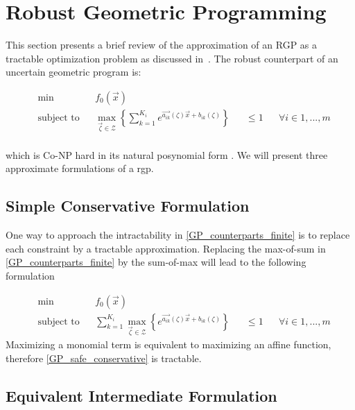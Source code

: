 \section{Robust Geometric Programming} \label{RGP}

This section presents a brief review of the approximation of an RGP as a
tractable optimization problem as discussed in~\cite{Saab2018}.
The robust counterpart of an uncertain geometric program is:

\begin{equation}
\begin{aligned}
& \min &&f_0\left(\vec{x}\right)\\
& \text{subject to} &&\max_{\vec{\zeta} \in \mathcal{Z}} \left\{\textstyle{\sum}_{k=1}^{K_i}e^{\vec{a_{ik}}\left(\zeta\right)\vec{x} + b_{ik}\left(\zeta\right)}\right\} &&\leq 1 &&\forall i \in 1,...,m\\
\end{aligned}
\label{GP_counterparts_finite}
\end{equation}

which is Co-NP hard in its natural posynomial form \cite{RGPcoNP}. We will present three approximate formulations of a \gls{rgp}.

\subsection{Simple Conservative Formulation}
One way to approach the intractability in \eqref{GP_counterparts_finite} is to replace each constraint by a tractable approximation.
Replacing the max-of-sum in \eqref{GP_counterparts_finite} by the sum-of-max will lead to the following formulation

\begin{equation}
\begin{aligned}
& \min &&f_0\left(\vec{x}\right)\\
& \text{subject to} &&\textstyle{\sum}_{k=1}^{K_i} {\displaystyle \max_{\vec{\zeta} \in \mathcal{Z}}} \left\{e^{\vec{a_{ik}}\left(\zeta\right)\vec{x} + b_{ik}\left(\zeta\right)}\right\} &&\leq 1 &&\forall i \in 1,...,m
\end{aligned}
\label{GP_safe_conservative}
\end{equation}
Maximizing a monomial term is equivalent to maximizing an affine function, therefore \eqref{GP_safe_conservative} is tractable.

\subsection{Equivalent Intermediate Formulation}


